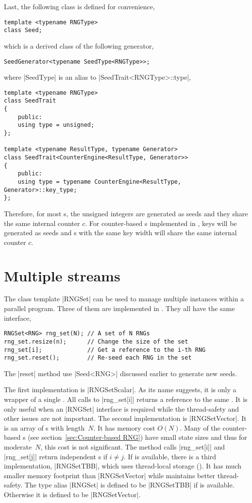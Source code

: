 Last, the following class is defined for convenience,
\begin{verbatim}
template <typename RNGType>
class Seed;
\end{verbatim}
which is a derived class of the following generator,
\begin{verbatim}
SeedGenerator<typename SeedType<RNGType>>;
\end{verbatim}
where |SeedType| is an alias to |SeedTrait<RNGType>::type|,
\begin{verbatim}
template <typename RNGType>
class SeedTrait
{
    public:
    using type = unsigned;
};

template <typename ResultType, typename Generator>
class SeedTrait<CounterEngine<ResultType, Generator>>
{
    public:
    using type = typename CounterEngine<ResultType, Generator>::key_type;
};
\end{verbatim}
Therefore, for most \rng{}s, the unsigned integers are generated as seeds and
they share the same internal counter $c$. For counter-based \rng{}s implemented
in \mckl, keys will be generated as seeds and \rng{}s with the same key width
will share the same internal counter $c$.

\section{Multiple \texorpdfstring{\rng}{RNG} streams}
\label{sec:Multiple RNG streams}

The class template |RNGSet| can be used to manage multiple \rng instances
within a parallel program. Three of them are implemented in \mckl. They all
have the same interface,
\begin{verbatim}
RNGSet<RNG> rng_set(N); // A set of N RNGs
rng_set.resize(n);      // Change the size of the set
rng_set[i];             // Get a reference to the i-th RNG
rng_set.reset();        // Re-seed each RNG in the set
\end{verbatim}
The |reset| method use |Seed<RNG>| discussed earlier to generate new seeds.

The first implementation is |RNGSetScalar|. As its name suggests, it is only a
wrapper of a single \rng. All calls to |rng_set[i]| returns a reference to the
same \rng. It is only useful when an |RNGSet| interface is required while the
thread-safety and other issues are not important. The second implementation is
|RNGSetVector|. It is an array of \rng{}s with length~$N$. It has memory cost
$O(N)$. Many of the counter-based \rng{}s (see section~\ref{sec:Counter-based
RNG}) have small state sizes and thus for moderate~$N$, this cost is not
significant. The method calls |rng_set[i]| and |rng_set[j]| return independent
\rng{}s if $i \ne j$. If \tbb is available, there is a third implementation,
|RNGSetTBB|, which uses thread-local storage (\tls). It has much smaller memory
footprint than |RNGSetVector| while maintains better thread-safety. The type
alias |RNGSet| is defined to be |RNGSetTBB| if \tbb is available. Otherwise it
is defined to be |RNGSetVector|.

